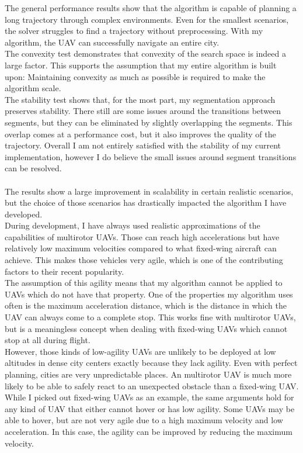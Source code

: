 The general performance results show that the algorithm is capable of planning a long trajectory through complex environments. Even for the smallest scenarios, the solver struggles to find a trajectory without preprocessing. With my algorithm, the UAV can successfully navigate an entire city. \\
The convexity test demonstrates that convexity of the search space is indeed a large factor. This supports the assumption that my entire algorithm is built upon: Maintaining convexity as much as possible is required to make the algorithm scale. \\
The stability test shows that, for the most part, my segmentation approach preserves stability. There still are some issues around the transitions between segments, but they can be eliminated by slightly overlapping the segments. This overlap comes at a performance cost, but it also improves the quality of the trajectory. Overall I am not entirely satisfied with the stability of my current implementation, however I do believe the small issues around segment transitions can be resolved. \\\\

The results show a large improvement in scalability in certain realistic scenarios, but the choice of those scenarios has drastically impacted the algorithm I have developed.\\

During development, I have always used realistic approximations of the capabilities of multirotor UAVs. Those can reach high accelerations but have relatively low maximum velocities compared to what fixed-wing aircraft can achieve. This makes those vehicles very agile, which is one of the contributing factors to their recent popularity. \\
The assumption of this agility means that my algorithm cannot be applied to UAVs which do not have that property. One of the properties my algorithm uses often is the maximum acceleration distance, which is the distance in which the UAV can always come to a complete stop. This works fine with multirotor UAVs, but is a meaningless concept when dealing with fixed-wing UAVs which cannot stop at all during flight. \\
However, those kinds of low-agility UAVs are unlikely to be deployed at low altitudes in dense city centers exactly because they lack agility. Even with perfect planning, cities are very unpredictable places. An multirotor UAV is much more likely to be able to safely react to an unexpected obstacle than a fixed-wing UAV. \\
While I picked out fixed-wing UAVs as an example, the same arguments hold for any kind of UAV that either cannot hover or has low agility. Some UAVs may be able to hover, but are not very agile due to a high maximum velocity and low acceleration. In this case, the agility can be improved by reducing the maximum velocity.\\ \\


